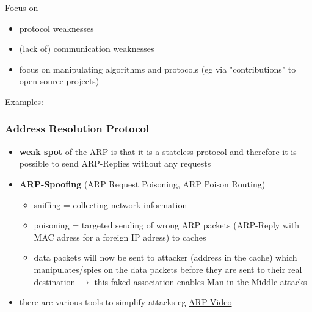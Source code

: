 \documentclass[11pt]{article}
\begin{document}
Focus on
\begin{itemize}
\item protocol weaknesses
\item (lack of) communication weaknesses
\item focus on manipulating algorithms and protocols (eg via "contributions" to open source projects)
\end{itemize}

Examples:\\
\subsubsection{Address Resolution Protocol}
\label{sec:org2a709a9}
\begin{itemize}
\item \textbf{weak spot} of the ARP is that it is a stateless protocol and therefore it is possible to send ARP-Replies without any requests
\item \textbf{ARP-Spoofing} (ARP Request Poisoning, ARP Poison Routing)
\begin{itemize}
\item sniffing = collecting network information
\item poisoning = targeted sending of wrong ARP packets (ARP-Reply with MAC adress for a foreign IP adress) to caches
\item data packets will now be sent to attacker (address in the cache) which manipulates/spies on the data packets before they are sent to their real destination \(\rightarrow\) this faked association enables Man-in-the-Middle attacks
\end{itemize}
\item there are various tools to simplify attacks eg \href{https://www.youtube.com/watch?v=RTXAUJ2yqCg}{ARP Video}
\end{itemize}
\end{document}
